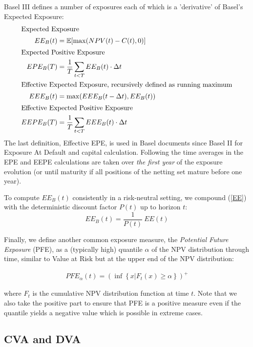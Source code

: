 \documentclass[12pt, a4paper]{article}
\newcommand\E{\ensuremath{\mathbb{E}}}
\newcommand{\PFE}{\mathit{PFE}}
\newcommand{\EE}{\mathit{EE}}
\begin{document}
{{\begin{appendix}
\medskip
Basel III defines a number of exposures each of which is a 'derivative' of Basel's Expected Exposure:
\begin{align}
\intertext{Expected Exposure}
EE_B(t) &= \E[\max(NPV(t) - C(t), 0)] \label{basel_ee}\\
\intertext{Expected Positive Exposure}
EPE_B(T) &= \frac{1}{T} \sum_{t<T} EE_B(t)\cdot \Delta t  \label{basel_epe} \\
\intertext{Effective Expected Exposure, recursively defined as running maximum}
EEE_B(t) &= \max(EEE_B(t-\Delta t), EE_B(t)) \label{basel_eee}\\
\intertext{Effective Expected Positive Exposure}
EEPE_B(T) &= \frac{1}{T} \sum_{t<T} EEE_B(t)\cdot \Delta t \label{basel_eepe}
\end{align}
The last definition, Effective EPE, is used in Basel documents since Basel II for Exposure At Default and capital
calculation. Following \cite{bcbs128,bcbs189} the time averages in the EPE and EEPE calculations are taken over {\em the
  first year} of the exposure evolution (or until maturity if all positions of the netting set mature before one year).

\medskip
To compute $EE_B(t)$ consistently in a risk-neutral setting, we compound (\ref{EE}) with the deterministic discount factor $P(t)$ up to horizon $t$:
$$
EE_B(t) = \frac{1}{P(t)} \:\EE(t)
$$

Finally, we define another common exposure measure, the {\em Potential Future Exposure} (PFE), as a (typically high)
quantile $\alpha$ of the NPV distribution through time, similar to Value at Risk but at the upper end of the NPV
distribution:

\begin{align}
  \PFE_\alpha(t) = \left(\inf\left\{ x | F_t(x) \geq \alpha\right\}\right)^+ \label{PFE}
\end{align}

where $F_t$ is the cumulative NPV distribution function at time $t$. Note that we also take the positive part to ensure
that PFE is a positive measure even if the quantile yields a negative value which is possible in extreme cases.
 
\subsection{CVA and DVA}\label{sec:app_cvadva}


\end{appendix}}}
\end{document}
